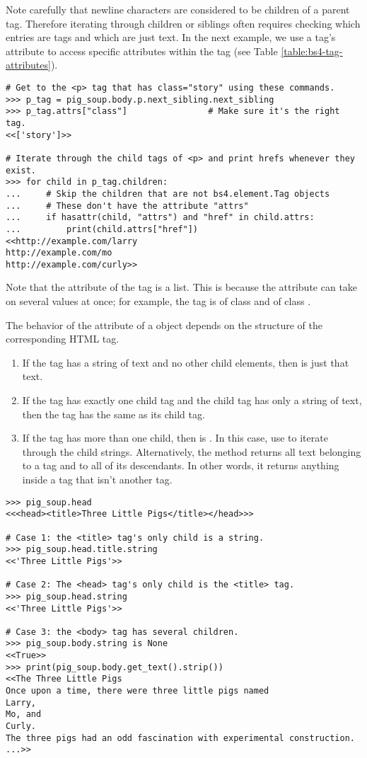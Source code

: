 Note carefully that newline characters are considered to be children of a parent tag.
Therefore iterating through children or siblings often requires checking which entries are tags and which are just text.
In the next example, we use a tag's  attribute to access specific attributes within the tag (see Table \ref{table:bs4-tag-attributes}).

\begin{lstlisting}
# Get to the <p> tag that has class="story" using these commands.
>>> p_tag = pig_soup.body.p.next_sibling.next_sibling
>>> p_tag.attrs["class"]                # Make sure it's the right tag.
<<['story']>>

# Iterate through the child tags of <p> and print hrefs whenever they exist.
>>> for child in p_tag.children:
...		# Skip the children that are not bs4.element.Tag objects
...		# These don't have the attribute "attrs"
...		if hasattr(child, "attrs") and "href" in child.attrs:
...			print(child.attrs["href"])
<<http://example.com/larry
http://example.com/mo
http://example.com/curly>>
\end{lstlisting}

Note that the  attribute of the  tag is a list.
This is because the  attribute can take on several values at once; for example, the tag  is of class  and of class .

The behavior of the  attribute of a  object depends on the structure of the corresponding HTML tag.
\begin{enumerate}
    \item If the tag has a string of text and no other child elements, then  is just that text.
    \item If the tag has exactly one child tag and the child tag has only a string of text, then the tag has the same  as its child tag.
    \item If the tag has more than one child, then  is .
    In this case, use  to iterate through the child strings.
    Alternatively, the  method returns all text belonging to a tag and to all of its descendants.
    In other words, it returns anything inside a tag that isn't another tag.
\end{enumerate}

\begin{lstlisting}
>>> pig_soup.head
<<<head><title>Three Little Pigs</title></head>>>

# Case 1: the <title> tag's only child is a string.
>>> pig_soup.head.title.string
<<'Three Little Pigs'>>

# Case 2: The <head> tag's only child is the <title> tag.
>>> pig_soup.head.string
<<'Three Little Pigs'>>

# Case 3: the <body> tag has several children.
>>> pig_soup.body.string is None
<<True>>
>>> print(pig_soup.body.get_text().strip())
<<The Three Little Pigs
Once upon a time, there were three little pigs named
Larry,
Mo, and
Curly.
The three pigs had an odd fascination with experimental construction.
...>>
\end{lstlisting}

